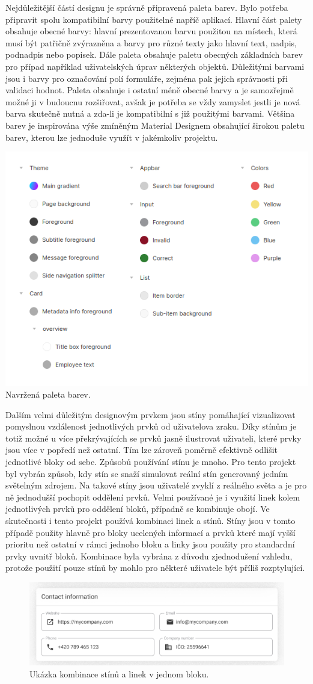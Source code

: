 		Nejdůležitější částí designu je správně připravená paleta barev.
		Bylo potřeba připravit spolu kompatibilní barvy použitelné napříč aplikací.
		Hlavní část palety obsahuje obecné barvy: hlavní prezentovanou barvu použitou na místech, která musí být
		patřičně zvýrazněna a barvy pro různé texty jako hlavní text, nadpis, podnadpis nebo popisek.
		Dále paleta obsahuje paletu obecných základních barev pro případ například uživatelských úprav některých objektů.
		Důležitými barvami jsou i barvy pro označování polí formuláře, zejména pak jejich správnosti při validaci
		hodnot.
		Paleta obsahuje i ostatní méně obecné barvy a je samozřejmě možné ji v budoucnu rozšiřovat, avšak je potřeba se
		vždy zamyslet jestli je nová barva skutečně nutná a zda-li je kompatibilní s již použitými barvami.
		Většina barev je inspirována výše zmíněným Material Designem obsahující širokou paletu barev, kterou lze jednoduše
		využít v jakémkoliv projektu.

		\includegraphics[width=0.24\linewidth]{obrazky/paleta_barev.png}\hfill
		Navržená paleta barev. %

		Dalším velmi důležitým designovým prvkem jsou stíny pomáhající vizualizovat pomyslnou vzdálenost jednotlivých
		prvků od uživatelova zraku.
		Díky stínům je totiž možné u více překrývajících se prvků jasně ilustrovat uživateli, které prvky jsou více v
		popředí než ostatní.
		Tím lze zároveň poměrně efektivně odlišit jednotlivé bloky od sebe.
		Způsobů používání stínu je mnoho.
		Pro tento projekt byl vybrán způsob, kdy stín se snaží simulovat reální stín generovaný jedním světelným zdrojem.
		Na takové stíny jsou uživatelé zvyklí z reálného světa a je pro ně jednodušší pochopit oddělení prvků.
		Velmi používané je i využití linek kolem jednotlivých prvků pro oddělení bloků, případně se kombinuje obojí.
		Ve skutečnosti i tento projekt používá kombinaci linek a stínů.
		Stíny jsou v tomto případě použity hlavně pro bloky ucelených informací a prvků které mají vyšší prioritu než
		ostatní v rámci jednoho bloku a linky jsou použity pro standardní prvky uvnitř bloků.
		Kombinace byla vybrána z důvodu zjednodušení vzhledu, protože použití pouze stínů by mohlo pro některé uživatele
		být příliš rozptylující.

		\begin{figure}[h]
			\centering
			\includegraphics[width=12cm]{obrazky/ukazka_stinu_a_linek}
			\caption{Ukázka kombinace stínů a linek v jednom bloku.}%
		\end{figure}

